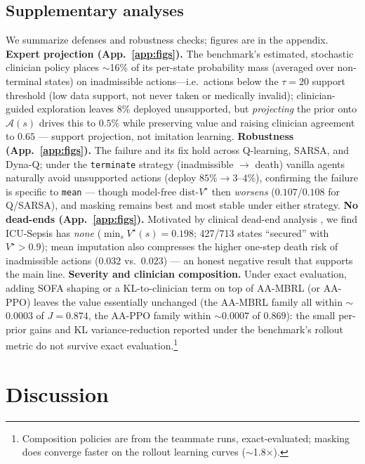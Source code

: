\documentclass{article}
\newcommand{\Adm}{\mathcal{A}}
\newcommand{\dist}{\mathrm{dist}\text{-}V^\star}
\begin{document}
\subsection{Supplementary analyses}
\label{sec:supp}
We summarize defenses and robustness checks; figures are in the appendix.
\textbf{Expert projection (App.~\ref{app:figs}).} The benchmark's estimated, stochastic clinician policy places $\sim$16\% of its
per-state probability mass (averaged over non-terminal states) on inadmissible
actions---i.e.\ actions below the $\tau{=}20$ support threshold (low data support,
not never taken or medically invalid); clinician-guided exploration leaves $8\%$
deployed unsupported, but \emph{projecting} the prior onto $\Adm(s)$ drives this to
$0.5\%$ while preserving value and raising clinician agreement to $0.65$ --- support
projection, not imitation learning.
\textbf{Robustness (App.~\ref{app:figs}).} The failure and its fix hold across
Q-learning, SARSA, and Dyna-Q; under the \texttt{terminate} strategy (inadmissible
$\to$ death) vanilla agents naturally avoid unsupported actions (deploy
$85\%{\to}3$--$4\%$), confirming the failure is specific to \texttt{mean} --- though
model-free $\dist$ then \emph{worsens} ($0.107$/$0.108$ for Q/SARSA), and masking
remains best and most stable under either strategy.
\textbf{No dead-ends (App.~\ref{app:figs}).} Motivated by clinical dead-end analysis
\citep{fatemi2021deadends}, we find ICU-Sepsis has \emph{none}
($\min_s V^\star(s){=}0.198$; 427/713 states ``secured'' with $V^\star{>}0.9$);
mean imputation also compresses the higher one-step death risk of inadmissible
actions ($0.032$ vs.\ $0.023$) --- an honest negative result that supports the main
line.
\textbf{Severity and clinician composition.} Under exact evaluation, adding SOFA
shaping or a KL-to-clinician term on top of AA-MBRL (or AA-PPO) leaves the value
essentially unchanged (the AA-MBRL family all within $\sim$$0.0003$ of $J{=}0.874$,
the AA-PPO family within $\sim$$0.0007$ of $0.869$): the small per-prior gains and KL
variance-reduction reported under the benchmark's rollout metric do not survive exact
evaluation.\footnote{Composition policies are from the teammate runs, exact-evaluated;
masking does converge faster on the rollout learning curves ($\sim$1.8$\times$).}

\section{Discussion}
\label{sec:discussion}
\end{document}
